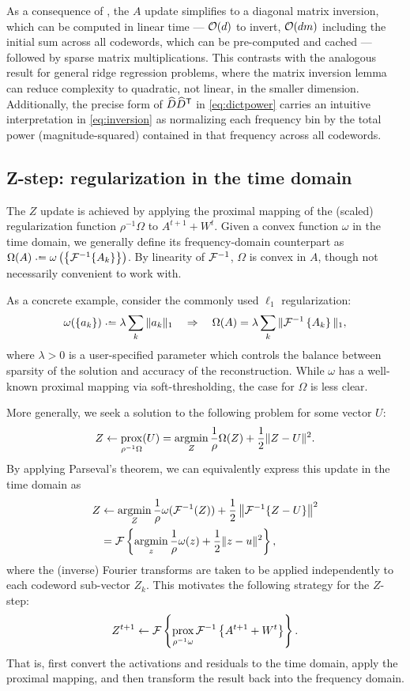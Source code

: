 \documentclass{article} %
\begin{document}
As a consequence of , the $A$ update simplifies to a diagonal matrix
inversion, which can be computed in linear time --- $\mathcal{O}(d)$ to invert, $\mathcal{O}(dm)$
including the initial sum across all codewords, which can be pre-computed and 
cached --- followed by sparse matrix multiplications.
This contrasts with the analogous result for general ridge regression problems, where the 
matrix inversion lemma can reduce complexity to quadratic, not linear, in the smaller 
dimension. 
Additionally, the precise form of $\widehat{D}\widehat{D}^\mathsf{T}$ in \eqref{eq:dictpower} 
carries an intuitive interpretation in \eqref{eq:inversion} as normalizing each frequency 
bin by the total power (magnitude-squared) contained in that frequency across all 
codewords.


\subsection{Z-step: regularization in the time domain}
The $Z$ update is achieved by applying the proximal mapping of the (scaled) 
regularization function $\rho^{-1}\Omega$ to $A^{t+1} + W^t$.  
Given a convex function $\omega$ in the time domain, we generally define its
frequency-domain counterpart as 
$\Omega(A) \defeq \omega\left(\left\{\F^{-1}\{A_k\}\right\}\right)$.  By linearity of
$\mathcal{F}^{-1}$, $\Omega$ is convex in $A$, though not necessarily convenient to work with.

As a concrete example, consider the commonly used $\ell_1$ regularization:
\[
\omega(\{a_k\}) \defeq \lambda \sum_k \|a_k\|_1
\quad \Rightarrow \quad
\Omega(A) = \lambda \sum_k \| \F^{-1} \left\{ A_k \right\} \|_1,
\]
where $\lambda>0$ is a user-specified parameter which controls the balance between
sparsity of the solution and accuracy of the reconstruction.  While $\omega$ has a
well-known proximal mapping via soft-thresholding, the case for $\Omega$ is less clear.

More generally, we seek a solution to the following problem for some vector $U$:
\[
Z \leftarrow \operatorname*{prox}_{\rho^{-1}\Omega}(U) = \operatorname*{argmin}_Z \frac{1}{\rho}\Omega(Z) + \frac{1}{2} \| Z - U\|^2.
\]
By applying Parseval's theorem, we can equivalently express this update in the time
domain as
\begin{align}
Z &\leftarrow \operatorname*{argmin}_Z \frac{1}{\rho} \omega(\mathcal{F}^{-1}(Z)) +
\frac{1}{2}\left\|\mathcal{F}^{-1}\{Z - U\}\right\|^2\notag\\
&= \mathcal{F}\left\{\operatorname*{argmin}_z \frac{1}{\rho} \omega(z) + \frac{1}{2} \|z - u\|^2
\right\},\label{eq:time-regularize}
\end{align}
where the (inverse) Fourier transforms are taken to be applied independently to 
each codeword sub-vector $Z_k$.  
This motivates the following strategy for the $Z$-step:
\begin{equation}
Z^{t+1} \leftarrow \mathcal{F}\left\{ \operatorname*{prox}_{\rho^{-1}\omega} \mathcal{F}^{-1}\left\{A^{t+1} + W^t
\right\} \right\}.\label{eq:timeprox}
\end{equation}
That is, first convert the activations and residuals to the time domain, apply the
proximal mapping, and then transform the result back into the frequency domain.
\end{document}
